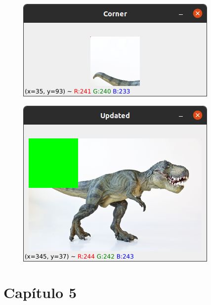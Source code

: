 \documentclass[12pt,letterpaper]{article}
\begin{document}
\begin{multicols}{2}
\begin{figure}[H]
\centering
\includegraphics[width = \columnwidth]{Resultado2_ch4.png}
\end{figure}

\begin{figure}[H]
\centering
\includegraphics[width = \columnwidth]{Resultado3_ch4.png}
\end{figure}


\section{Capítulo 5}


\end{multicols}
\end{document}
